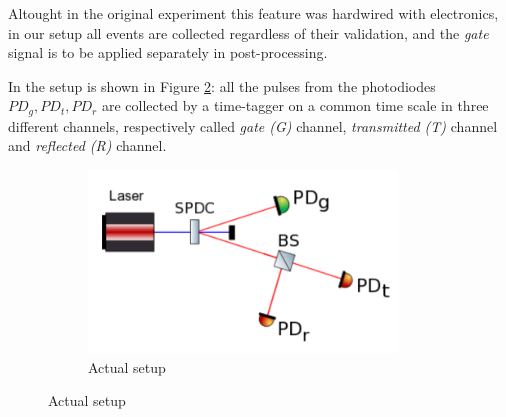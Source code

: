\documentclass[10pt, final]{article}
\begin{document}
\begin{multicols}{2}
Altought in the original experiment this feature was hardwired with electronics, in our setup all events are collected regardless of their validation, and the \emph{gate} signal is to be applied separately in post-processing.

In the setup is shown in Figure \ref{our}: all the pulses from the photodiodes $PD_g, PD_t, PD_r$ are collected by a time-tagger on a common time scale in three different channels, respectively called \emph{gate (G)} channel, \emph{transmitted (T)} channel and \emph{reflected (R)} channel.


\begin{mdframed}
    \begin{figure}[H]
        \begin{subfigure}{\textwidth}
            \centering
            \includegraphics[width = 0.9\textwidth]{../images/our_setup.png}
            \caption{Actual setup}
            \label{our}
        \end{subfigure}


\end{figure}
\end{mdframed}
\end{multicols}
\end{document}
